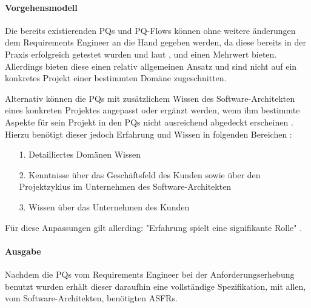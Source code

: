 \paragraph{Vorgehensmodell} \label{probing_model}

Die bereits existierenden PQs und PQ-Flows k\"onnen ohne weitere \"anderungen dem Requirements Engineer an die Hand gegeben werden, da diese bereits in der Praxis erfolgreich getestet wurden und laut \cite{Ros01}, \cite{Ros02} und \cite{Ros03} einen Mehrwert bieten. Allerdings bieten diese einen relativ allgemeinen Ansatz und sind nicht auf ein konkretes Projekt einer bestimmten Dom\"ane zugeschnitten. 

Alternativ k\"onnen die PQs mit zus\"atzlichem Wissen des Software-Architekten eines konkreten Projektes angepasst oder erg\"anzt werden, wenn ihm bestimmte Aspekte f\"ur sein Projekt in den PQs nicht ausreichend abgedeckt erscheinen \cite{Ros02}. Hierzu ben\"otigt dieser jedoch Erfahrung und Wissen in folgenden Bereichen \cite{Ros02}: \\

\begin{itemize}
\item[1.] Detailliertes Dom\"anen Wissen
\item[2.] Kenntnisse \"uber das Gesch\"aftsfeld des Kunden sowie \"uber den Projektzyklus im Unternehmen des Software-Architekten
\item[3.] Wissen \"uber das Unternehmen des Kunden
\end{itemize}

F\"ur diese Anpassungen gilt allerding: "Erfahrung spielt eine signifikante Rolle" \cite{Ros02}. \\

\paragraph{Ausgabe}

Nachdem die PQs vom Requirements Engineer bei der Anforderungserhebung benutzt wurden erh\"alt dieser daraufhin eine vollst\"andige Spezifikation, mit allen, vom Software-Architekten, ben\"otigten ASFRs. \\

